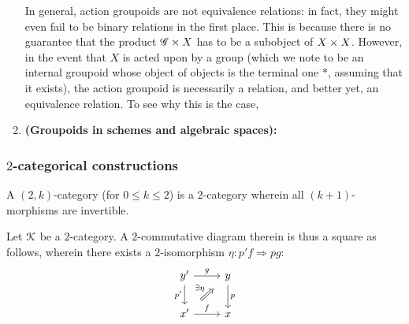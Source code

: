 \begin{example}
\begin{enumerate}
                    In general, action groupoids are not equivalence relations: in fact, they might even fail to be binary relations in the first place. This is because there is no guarantee that the product $\scrG \x X$ has to be a subobject of $X \x X$. However, in the event that $X$ is acted upon by a group (which we note to be an internal groupoid whose object of objects is the terminal one $*$, assuming that it exists), the action groupoid is necessarily a relation, and better yet, an equivalence relation. To see why this is the case, 
                    \item \textbf{(Groupoids in schemes and algebraic spaces):} 
                \end{enumerate}
            \end{example}
        
        \subsubsection{\texorpdfstring{$2$}{}-categorical constructions}
        \begin{definition} \label{def: 2_categories_and_2_functors}
            
        \end{definition}
        \begin{definition}[$(2, k)$-categories] \label{def: (2, k)_categories} 
            A $(2, k)$-category (for $0 \leq k \leq 2$) is a $2$-category wherein all $(k + 1)$-morphisms are invertible.
        \end{definition}
        
        \begin{definition} \label{def: 2_commutative_diagrams}
            Let $\mathcal{K}$ be a $2$-category. A $2$-commutative diagram therein is thus a square as follows, wherein there exists a $2$-isomorphism $\eta: p'f \Rightarrow pg$:
                $$
                    \begin{tikzcd}
                    	{y'} & y \\
                    	{x'} & x
                    	\arrow["{p'}"', from=1-1, to=2-1]
                    	\arrow["f", from=2-1, to=2-2]
                    	\arrow["g", from=1-1, to=1-2]
                    	\arrow["p", from=1-2, to=2-2]
                    	\arrow["\exists \eta", shorten <=8pt, shorten >=8pt, Rightarrow, from=2-1, to=1-2]
                    \end{tikzcd}
                $$
        \end{definition}
        
